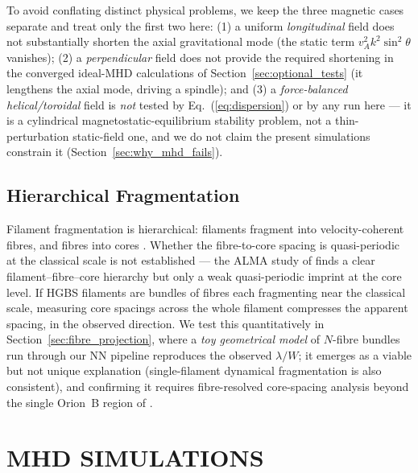 \documentclass[usenatbib,twoside,twocolumn]{mnras}
\begin{document}
To avoid conflating distinct physical problems, we keep the three magnetic cases separate and treat only the first two here: (1) a uniform \emph{longitudinal} field does not substantially shorten the axial gravitational mode (the static term $v_A^2k^2\sin^2\theta$ vanishes); (2) a \emph{perpendicular} field does not provide the required shortening in the converged ideal-MHD calculations of Section~\ref{sec:optional_tests} (it lengthens the axial mode, driving a spindle); and (3) a \emph{force-balanced helical/toroidal} field is \emph{not} tested by Eq.~(\ref{eq:dispersion}) or by any run here --- it is a cylindrical magnetostatic-equilibrium stability problem, not a thin-perturbation static-field one, and we do not claim the present simulations constrain it (Section~\ref{sec:why_mhd_fails}).

\subsection{Hierarchical Fragmentation}

Filament fragmentation is hierarchical: filaments fragment into velocity-coherent fibres, and fibres into cores \citep{Hacar2013,Hacar2018,Yang2024}. Whether the fibre-to-core spacing is quasi-periodic at the classical scale is not established --- the ALMA study of \citet{Yang2024} finds a clear filament--fibre--core hierarchy but only a weak quasi-periodic imprint at the core level. If HGBS filaments are bundles of fibres each fragmenting near the classical scale, measuring core spacings across the whole filament compresses the apparent spacing, in the observed direction. We test this quantitatively in Section~\ref{sec:fibre_projection}, where a \emph{toy geometrical model} of $N$-fibre bundles run through our NN pipeline reproduces the observed $\lambda/W$; it emerges as a viable but not unique explanation (single-filament dynamical fragmentation is also consistent), and confirming it requires fibre-resolved core-spacing analysis beyond the single Orion~B region of \citet{Yang2024}.

\section{MHD SIMULATIONS}
\end{document}
